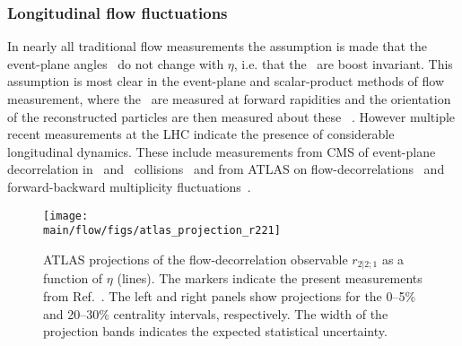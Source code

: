 \subsubsection{Longitudinal flow fluctuations}

In nearly all traditional flow measurements the assumption is made that the 
  event-plane angles \psin\ do not change with $\eta$, i.e. that the \psin\
  are boost invariant.
This assumption is most clear in the event-plane and scalar-product methods
  of flow measurement,  where the \psin\ are measured at forward rapidities
  and the orientation of the reconstructed particles are then measured about
  these \psin~\cite{HION-2011-01,HION-2016-06}.
However multiple recent measurements at the LHC indicate the presence of 
  considerable longitudinal dynamics.
These include measurements from CMS of event-plane decorrelation in \ppb\ and \pbpb\ 
  collisions~\cite{CMS-HIN-14-012,CMS-HIN-15-008} and from ATLAS on flow-decorrelations~\cite{HION-2016-04}
  and forward-backward multiplicity fluctuations~\cite{HION-2015-13}.




\begin{figure*}[!htb]
\begin{center}
\texttt{[image: \\main/flow/figs/atlas\_projection\_r221]}
\caption{
ATLAS projections of the flow-decorrelation observable $r_{2|2;1}$ 
  as a function of $\eta$ (lines).
The markers indicate the present measurements from Ref.~\cite{HION-2016-04}.
The left and right panels show projections for the 0--5\% and 20--30\%
  centrality intervals, respectively.
The width of the projection bands indicates the expected statistical uncertainty.
}
\label{fig:atlas_r221}
\end{center}
\end{figure*}


